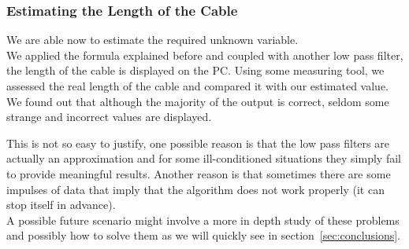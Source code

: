 \subsubsection{Estimating the Length of the Cable}
We are able now to estimate the required unknown variable. \\ We applied the formula explained before and coupled with another low pass filter, the length of the cable is displayed on the PC. Using some measuring tool, we assessed the real length of the cable and compared it with our estimated value. We found out that although the majority of the output is correct, seldom some strange and incorrect values are displayed. \par This is not so easy to justify, one possible reason is that the low pass filters are actually an approximation and for some ill-conditioned situations they simply fail to provide meaningful results. Another reason is that sometimes there are some impulses of data that imply that the algorithm does not work properly (it can stop itself in advance).\\
A possible future scenario might involve a more in depth study of these problems and possibly how to solve them as we will quickly see in section~\ref{sec:conclusions}.
